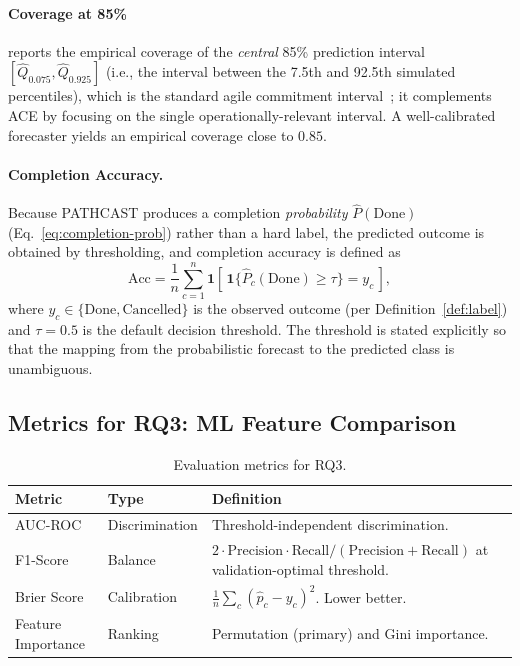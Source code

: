 \paragraph{Coverage at 85\%} reports the empirical coverage of the
\emph{central} 85\% prediction interval $[\hat{Q}_{0.075}, \hat{Q}_{0.925}]$
(i.e., the interval between the 7.5th and 92.5th simulated percentiles),
which is the standard agile commitment interval~\cite{vacanti2015}; it
complements ACE by focusing on the single operationally-relevant interval. A
well-calibrated forecaster yields an empirical coverage close to $0.85$.

\paragraph{Completion Accuracy.} Because PATHCAST produces a completion
\emph{probability} $\hat{P}(\text{Done})$ (Eq.~\ref{eq:completion-prob})
rather than a hard label, the predicted outcome is obtained by thresholding,
and completion accuracy is defined as
\begin{equation}
\label{eq:completion-acc}
\text{Acc} = \frac{1}{n}\sum_{c=1}^{n}
   \mathbf{1}\!\left[\,\mathbf{1}\{\hat{P}_c(\text{Done}) \geq \tau\}
   = y_c\,\right],
\end{equation}
where $y_c \in \{\text{Done}, \text{Cancelled}\}$ is the observed outcome
(per Definition~\ref{def:label}) and $\tau = 0.5$ is the default decision
threshold. The threshold is stated explicitly so that the mapping from the
probabilistic forecast to the predicted class is unambiguous.


\subsection{Metrics for RQ3: ML Feature Comparison}
\label{sec:metrics-rq3}

\begin{table}[ht]
\centering
\caption{Evaluation metrics for RQ3.}
\label{tab:metrics-rq3}
\small
\begin{tabular}{@{}l l p{7.4cm}@{}}
\toprule
\textbf{Metric} & \textbf{Type} & \textbf{Definition} \\
\midrule
AUC-ROC & Discrimination & Threshold-independent discrimination. \\
F1-Score & Balance & $2 \cdot \mathrm{Precision} \cdot \mathrm{Recall} / (\mathrm{Precision} + \mathrm{Recall})$ at validation-optimal threshold. \\
Brier Score & Calibration & $\tfrac{1}{n}\sum_c (\hat{p}_c - y_c)^2$. Lower better. \\
Feature Importance & Ranking & Permutation (primary) and Gini importance. \\
\bottomrule
\end{tabular}
\end{table}

